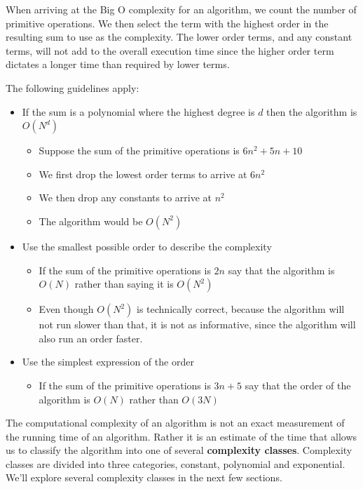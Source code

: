 When arriving at the Big O complexity for an algorithm, we count the number of primitive operations.  We then select the term with the highest order in the resulting sum to use as the complexity.    The lower order terms, and any constant terms, will not add to the overall execution time since the higher order term dictates a longer time than required by lower terms.

The following guidelines apply:

\begin{itemize}
\item If the sum is a polynomial where the highest degree is $d$ then the algorithm is $O(N^d)$
\begin{itemize}
\item Suppose the sum of the primitive operations is $6n^2 + 5n + 10$
\item We first drop the lowest order terms to arrive at $6n^2$
\item We then drop any constants to arrive at $n^2$
\item The algorithm would be $O(N^2)$
\end{itemize}
\item Use the smallest possible order to describe the complexity
\begin{itemize}
\item If the sum of the primitive operations is $2n$  say that the algorithm is $O(N)$ rather than saying it is $O(N^2)$
\item Even though $O(N^2)$ is technically correct, because the algorithm will not run slower than that, it is not as informative, since the algorithm will also run an order faster.
\end{itemize}
\item Use the simplest expression of the order
\begin{itemize}
\item If the sum of the primitive operations is $3n+5$  say that the order of the algorithm is $O(N)$ rather than $O(3N)$
\end{itemize}

\end{itemize}

The computational complexity of an algorithm is not an exact measurement of the running time of an algorithm.   Rather it is an estimate of the time that allows us to classify the algorithm into one of several \textbf{complexity classes}.   Complexity classes are divided into three categories,  constant, polynomial and exponential.    We'll explore several complexity classes in the next few sections.

